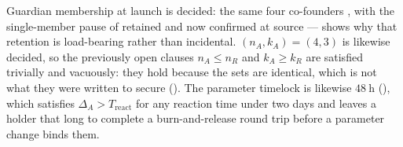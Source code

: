 Guardian membership at launch is decided: the same four co-founders
, with the single-member pause of 
retained and now confirmed at source ---  shows why that retention is load-bearing
rather than incidental. $(n_A, k_A) = (4,3)$ is likewise decided, so the previously open clauses
$n_A \le n_R$ and $k_A \ge k_R$ are satisfied trivially and vacuously: they hold because the sets are
identical, which is not what they were written to secure ().
The parameter timelock is likewise $\qty{48}{\hour}$ (), which
satisfies $\Delta_A > T_{\mathrm{react}}$ for any reaction time under two days and leaves a holder
that long to complete a burn-and-release round trip before a parameter change binds them.

